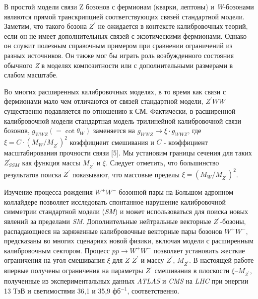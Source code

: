 В простой модели связи Z бозонов с фермионам (кварки, лептоны) и \textit{W}-бозонами являются прямой транскрипцией соответствующих связей стандартной модели. Заметим, что такого бозона $Z^\prime$ не ожидается в контексте калибровочных теорий, если он не имеет дополнительных связей с экзотическими фермионами. Однако он служит полезным справочным примером при сравнении ограничений из разных источников. Он также мог бы играть роль возбужденного состояния обычного \textit{Z} в моделях композитности или с дополнительными размерами в слабом масштабе.

Во многих расширенных калибровочных моделях, в то время как связи с фермионами мало чем отличаются от связей стандартной модели, $Z^\prime WW$ существенно подавляется по отношению к СМ. Фактически, в расширенной калибровочной модели стандартная модель трилинейной калибровочной связи бозонов, $g_{WWZ}(=\cot \theta_{W})$ заменяется на $g_{WWZ}\rightarrow\xi \cdot g_{WWZ}$, где $\xi = C \cdot (M_{W}/M_{Z^\prime})^2$ коэффициент смешивания и $C$ - коэффициент масштабирования прочности связи [5]. Мы установим границы сечения для таких $Z^\prime_{SSM}$ как функция массы $M_{Z^\prime}$ и $\xi$. Следует отметить, что большинство результатов поиска $Z^\prime$ показывают, что массовые пределы $\xi = (M_{W}/M_{Z^\prime})^2$.

Изучение процесса рождения ${W}^{+}{W}^{-}$ бозонной пары на Большом адронном коллайдере позволяет исследовать спонтанное нарушение калибровочной симметрии стандартной модели (\textit{SM}) и может использоваться для поиска новых явлений за пределами \textit{SM}. Дополнительные нейтральные векторные ${Z}^{\prime}$-бозоны, распадающиеся на заряженные калибровочные векторные пары бозонов ${W}^{+}{W}^{-}$, предсказаны во многих сценариях новой физики, включая модели с расширенным калибровочным сектором. Процесс $pp \rightarrow {W}^{+}{W}^{-}$  позволяет установить жесткие ограничения на угол смешивания $\xi$ для $Z$-${Z}^{\prime}$ и массу ${Z}^{\prime}$, ${M}_{{Z}^{\prime}}$. В настоящей работе впервые получены ограничения на параметры ${Z}^{\prime}$ смешивания в плоскости $\xi$–${M}_{{Z}^{\prime}}$, полученные из экспериментальных данных \textit{ATLAS} и \textit{CMS} на \textit{LHC} при энергии 13 ТэВ и светимостями 36,1 и 35,9 фб${}^{−1}$, соответственно.

